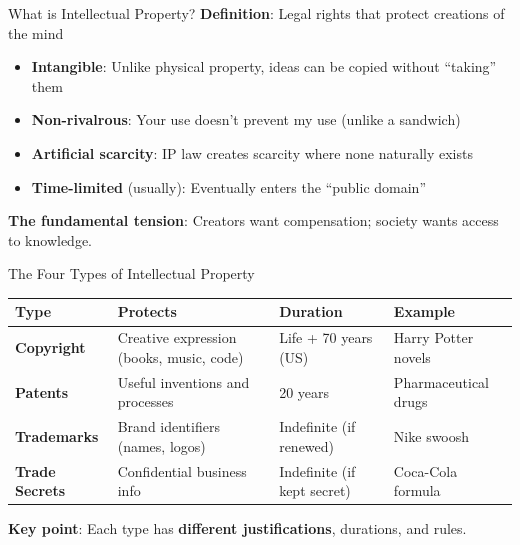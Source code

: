 ﻿\documentclass[aspectratio=169,11pt]{beamer}
\begin{document}
\begin{frame}{What is Intellectual Property?}
\textbf{Definition}: Legal rights that protect creations of the mind

\vspace{0.2cm}
\begin{itemize}
    \item \textbf{Intangible}: Unlike physical property, ideas can be copied without ``taking'' them
    \item \textbf{Non-rivalrous}: Your use doesn't prevent my use (unlike a sandwich)
    \item \textbf{Artificial scarcity}: IP law creates scarcity where none naturally exists
    \item \textbf{Time-limited} (usually): Eventually enters the ``public domain''
\end{itemize}

\vspace{0.3cm}
\begin{center}
\end{center}

\vspace{0.2cm}
\textbf{The fundamental tension}: Creators want compensation; society wants access to knowledge.
\end{frame}

\begin{frame}{The Four Types of Intellectual Property}
\begin{table}[h]
\centering
\small
\begin{tabular}{>{\bfseries}l p{4cm} l p{3cm}}
\toprule
Type & Protects & Duration & Example \\
\midrule
Copyright & Creative expression (books, music, code) & Life + 70 years (US) & Harry Potter novels \\
Patents & Useful inventions and processes & 20 years & Pharmaceutical drugs \\
Trademarks & Brand identifiers (names, logos) & Indefinite (if renewed) & Nike swoosh \\
Trade Secrets & Confidential business info & Indefinite (if kept secret) & Coca-Cola formula \\
\bottomrule
\end{tabular}
\end{table}

\vspace{0.3cm}
\textbf{Key point}: Each type has \textbf{different justifications}, durations, and rules.
\end{frame}
\end{document}
